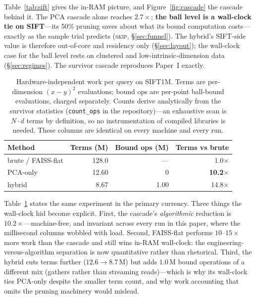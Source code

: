 \documentclass[sigconf,nonacm]{acmart}
\begin{document}
Table~\ref{tab:sift} gives the in-RAM picture, and
Figure~\ref{fig:cascade} the cascade behind it. The PCA cascade alone reaches
$2.7\times$; \textbf{the ball level is a wall-clock tie on SIFT}---its
50\% pruning saves about what its bound computation costs---exactly as the
sample trial predicts (\textsc{skip}, \S\ref{sec:funnel}). The hybrid's
SIFT-side value is therefore out-of-core and residency only
(\S\ref{sec:layout}); the wall-clock case for the ball level rests on
clustered and low-intrinsic-dimension data (\S\ref{sec:regimes}). The
survivor cascade reproduces Paper~I exactly.

\begin{table}[t]
\caption{Hardware-independent work per query on SIFT1M. Terms are
per-dimension $(x{-}y)^2$ evaluations; bound ops are per-point ball-bound
evaluations, charged separately. Counts derive analytically from the
survivor statistics (\texttt{count\_ops} in the repository)---an exhaustive
scan is $N \cdot d$ terms by definition, so no instrumentation of compiled
libraries is needed. These columns are identical on every machine and every
run.}
\label{tab:ops}
\small
\begin{tabular}{@{}lrrr@{}}
\toprule
Method & Terms (M) & Bound ops (M) & Terms vs brute \\
\midrule
brute / FAISS-flat & 128.0 & --- & 1.0$\times$ \\
PCA-only~\cite{paper1} & 12.60 & 0 & \textbf{10.2$\times$} \\
hybrid & 8.67 & 1.00 & 14.8$\times$ \\
\bottomrule
\end{tabular}
\end{table}

Table~\ref{tab:ops} states the same experiment in the primary currency.
Three things the wall-clock hid become explicit. First, the cascade's
\emph{algorithmic} reduction is $10.2\times$---machine-free, and invariant
across every run in this paper, where the millisecond columns wobbled with
load. Second, FAISS-flat performs $10$--$15\times$ more work than the
cascade and still wins in-RAM wall-clock: the engineering-versus-algorithm
separation is now quantitative rather than rhetorical. Third, the hybrid
cuts terms further ($12.6 \to 8.7$\,M) but adds $1.0$\,M bound operations of
a different mix (gathers rather than streaming reads)---which is why its
wall-clock ties PCA-only despite the smaller term count, and why work
accounting that omits the pruning machinery would mislead.
\end{document}
